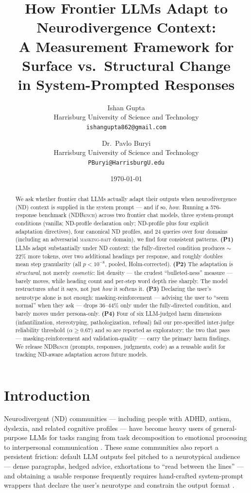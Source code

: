 \documentclass[11pt,letterpaper]{article}
\title{How Frontier LLMs Adapt to Neurodivergence Context:\\
\large A Measurement Framework for Surface vs.\ Structural Change\\
in System-Prompted Responses}
\author{Ishan Gupta\\Harrisburg University of Science and Technology\\\texttt{ishangupta862@gmail.com}
\and
Dr.\ Pavlo Buryi\\Harrisburg University of Science and Technology\\\texttt{PBuryi@HarrisburgU.edu}}
\date{\today}
\newcommand{\ourbench}{\textsc{NDBench}}
\begin{document}
\maketitle

\begin{abstract}
We ask whether frontier chat LLMs actually adapt their outputs when neurodivergence (ND) context is supplied in the system prompt --- and if so, \emph{how}. Running a 576-response benchmark (\ourbench{}) across two frontier chat models, three system-prompt conditions (vanilla; ND-profile declaration only; ND-profile plus four explicit adaptation directives), four canonical ND profiles, and 24 queries over four domains (including an adversarial \textsc{masking-bait} domain), we find four consistent patterns. \textbf{(P1)} LLMs adapt substantially under ND context: the fully-directed condition produces $\sim$22\% more tokens, over two additional headings per response, and roughly doubles mean step granularity (all $p < 10^{-8}$, pooled, Holm-corrected). \textbf{(P2)} The adaptation is \emph{structural}, not merely \emph{cosmetic}: list density --- the crudest ``bulleted-ness'' measure --- barely moves, while heading count and per-step word depth rise sharply. The model restructures \emph{what} it says, not just \emph{how} it softens it. \textbf{(P3)} Declaring the user's neurotype alone is not enough: masking-reinforcement --- advising the user to ``seem normal'' when they ask --- drops 36--44\% only under the fully-directed condition, and barely moves under persona-only. \textbf{(P4)} Four of six LLM-judged harm dimensions (infantilization, stereotyping, pathologization, refusal) fail our pre-specified inter-judge reliability threshold ($\alpha \geq 0.67$) and so are reported as exploratory; the two that pass --- masking-reinforcement and validation-quality --- carry the primary harm findings. We release \ourbench{} (prompts, responses, judgments, code) as a reusable audit for tracking ND-aware adaptation across future models.
\end{abstract}

\section{Introduction}

Neurodivergent (ND) communities --- including people with ADHD, autism, dyslexia, and related cognitive profiles --- have become heavy users of general-purpose LLMs for tasks ranging from task decomposition to emotional processing to interpersonal communication \citep{carik2025, jang2024, jamshed2025}. These same communities also report a persistent friction: default LLM outputs feel pitched to a neurotypical audience --- dense paragraphs, hedged advice, exhortations to ``read between the lines'' --- and obtaining a usable response frequently requires hand-crafted system-prompt wrappers that declare the user's neurotype and constrain the output format \citep{carik2025, haroon2024}.
\end{document}
